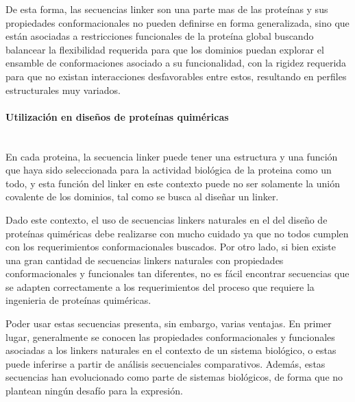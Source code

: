 De esta forma, las secuencias linker son una parte mas de las proteínas y sus propiedades conformacionales no pueden definirse en forma generalizada, sino que están 
asociadas a restricciones funcionales de la proteína global buscando balancear la flexibilidad requerida 
para que los dominios puedan explorar el ensamble de conformaciones asociado a su funcionalidad, con la rigidez requerida para que no existan interacciones desfavorables entre estos, 
resultando en perfiles estructurales muy variados.




\paragraph{Utilización en diseños de proteínas quiméricas} \hspace{0pt} \\

En cada proteina, la secuencia linker puede tener una estructura y una función que haya sido seleccionada para la actividad biológica de la proteina como un todo, 
y esta función del linker en este contexto puede no ser solamente la unión covalente de los dominios, tal como se busca al diseñar un linker. 


Dado este contexto, el uso de secuencias linkers naturales en el del diseño de proteínas quiméricas debe realizarse con mucho cuidado ya que no todos cumplen con los requerimientos conformacionales buscados.
Por otro lado, si bien existe una gran cantidad de secuencias linkers naturales con propiedades conformacionales y funcionales tan diferentes, no es fácil encontrar secuencias que se adapten correctamente a los requerimientos del proceso
que requiere la ingenieria de proteínas quiméricas.

Poder usar estas secuencias presenta, sin embargo, varias ventajas. 
En primer lugar, generalmente se conocen las propiedades conformacionales y funcionales asociadas a los linkers naturales en el contexto de un sistema biológico, o estas puede inferirse a partir de análisis secuenciales comparativos. 
Además, estas secuencias han evolucionado como parte de sistemas biológicos, de forma que no plantean ningún desafío para la expresión.









